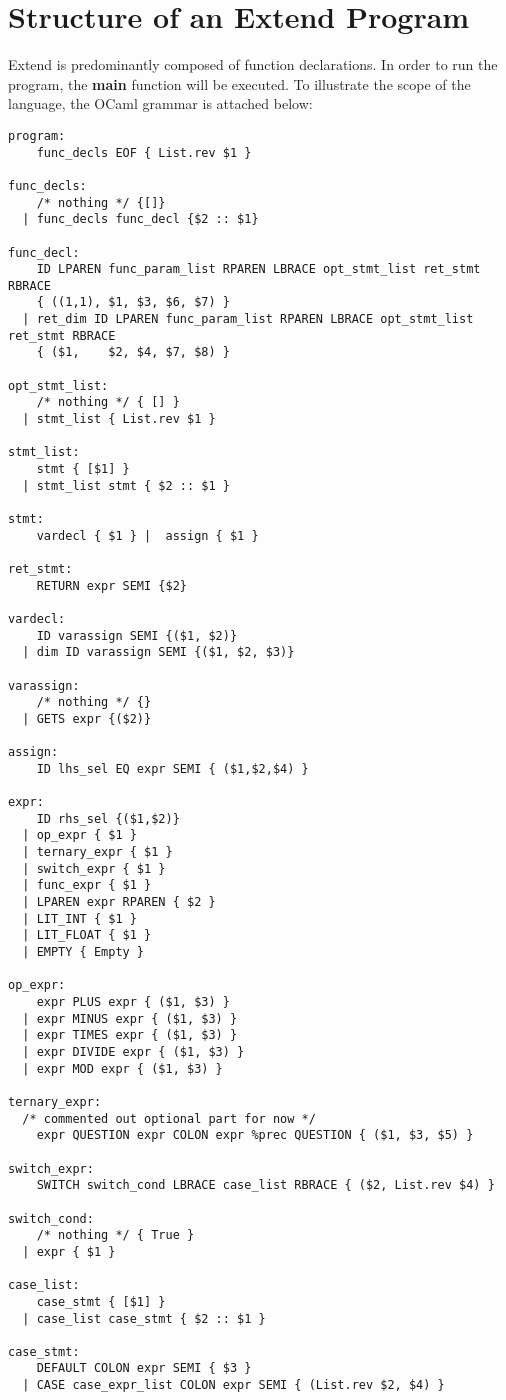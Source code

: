 \documentclass[titlepage]{article}
\begin{document}
\section{Structure of an Extend Program}
	Extend is predominantly composed of function declarations. In order to run the program, the \textbf{main} function will be executed. To illustrate the scope of the language, the OCaml grammar is attached below:
\begin{verbatim}
program:
    func_decls EOF { List.rev $1 }

func_decls:
    /* nothing */ {[]}
  | func_decls func_decl {$2 :: $1}

func_decl:
    ID LPAREN func_param_list RPAREN LBRACE opt_stmt_list ret_stmt RBRACE
    { ((1,1), $1, $3, $6, $7) }
  | ret_dim ID LPAREN func_param_list RPAREN LBRACE opt_stmt_list ret_stmt RBRACE
    { ($1,    $2, $4, $7, $8) }

opt_stmt_list:
    /* nothing */ { [] }
  | stmt_list { List.rev $1 }

stmt_list:
    stmt { [$1] }
  | stmt_list stmt { $2 :: $1 }

stmt:
    vardecl { $1 } |  assign { $1 }

ret_stmt:
    RETURN expr SEMI {$2}

vardecl:
    ID varassign SEMI {($1, $2)}
  | dim ID varassign SEMI {($1, $2, $3)}

varassign:
    /* nothing */ {}
  | GETS expr {($2)}

assign:
    ID lhs_sel EQ expr SEMI { ($1,$2,$4) }

expr:
    ID rhs_sel {($1,$2)}
  | op_expr { $1 }
  | ternary_expr { $1 }
  | switch_expr { $1 }
  | func_expr { $1 }
  | LPAREN expr RPAREN { $2 }
  | LIT_INT { $1 }
  | LIT_FLOAT { $1 }
  | EMPTY { Empty }

op_expr:
    expr PLUS expr { ($1, $3) }
  | expr MINUS expr { ($1, $3) }
  | expr TIMES expr { ($1, $3) }
  | expr DIVIDE expr { ($1, $3) }
  | expr MOD expr { ($1, $3) }

ternary_expr:
  /* commented out optional part for now */
    expr QUESTION expr COLON expr %prec QUESTION { ($1, $3, $5) }

switch_expr:
    SWITCH switch_cond LBRACE case_list RBRACE { ($2, List.rev $4) }

switch_cond:
    /* nothing */ { True }
  | expr { $1 }

case_list:
    case_stmt { [$1] }
  | case_list case_stmt { $2 :: $1 }

case_stmt:
    DEFAULT COLON expr SEMI { $3 }
  | CASE case_expr_list COLON expr SEMI { (List.rev $2, $4) }


\end{verbatim}
\end{document}
